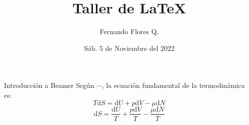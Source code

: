\documentclass[12pt]{beamer}
\author{Fernando Flores Q.}
\title{\bf Taller de \LaTeX}
\institute{Facultad de Ciencias Naturales y Matemática}
\date{Sáb. 5 de Noviembre del 2022}
\begin{document}
\begin{frame}
\titlepage
\end{frame}


\begin{frame}{Introducción a Beamer}
Según $\cdots$, la ecuación fundamental de la termodinámica es:\begin{equation}
T\text{d}S=\text{d}U+p\text{d}V-\mu\text{d}N
\end{equation}
$$\text{d}S=\frac{\text{d}U}{T}+\frac{p\text{d}V}{T}-\frac{\mu\text{d}N}{T}$$
\end{frame}
\end{document}
